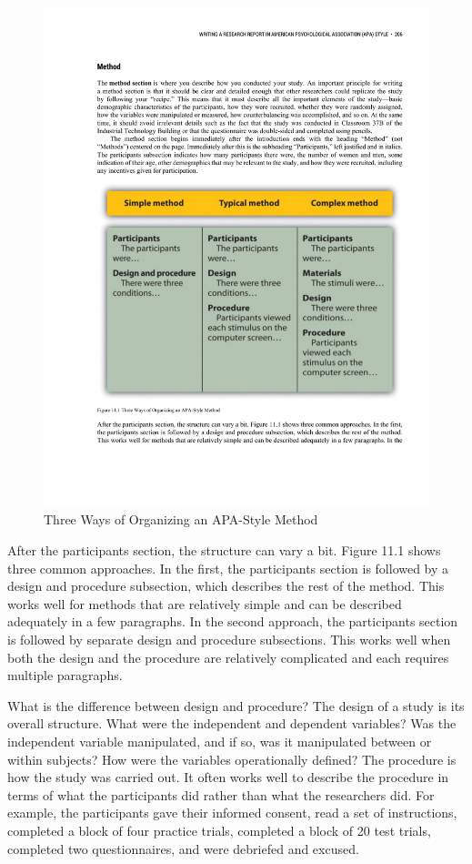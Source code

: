 \begin{figure}
\includegraphics[width=\linewidth]{figures/C11methods.pdf}
\caption{Three Ways of Organizing an APA-Style Method}
\label{fig:method}
\end{figure}


After the participants section, the structure can vary a bit. Figure 11.1 shows three common approaches. In the first, the participants section is followed by a design and procedure subsection, which describes the rest of the method. This works well for methods that are relatively simple and can be described adequately in a few paragraphs. In the second approach, the participants section is followed by separate design and procedure subsections. This works well when both the design and the procedure are relatively complicated and each requires multiple paragraphs.

What is the difference between design and procedure? The design of a study is its overall structure. What were the independent and dependent variables? Was the independent variable manipulated, and if so, was it manipulated between or within subjects? How were the variables operationally defined? The procedure is how the study was carried out. It often works well to describe the procedure in terms of what the participants did rather than what the researchers did. For example, the participants gave their informed consent, read a set of instructions, completed a block of four practice trials, completed a block of 20 test trials, completed two questionnaires, and were debriefed and excused.

